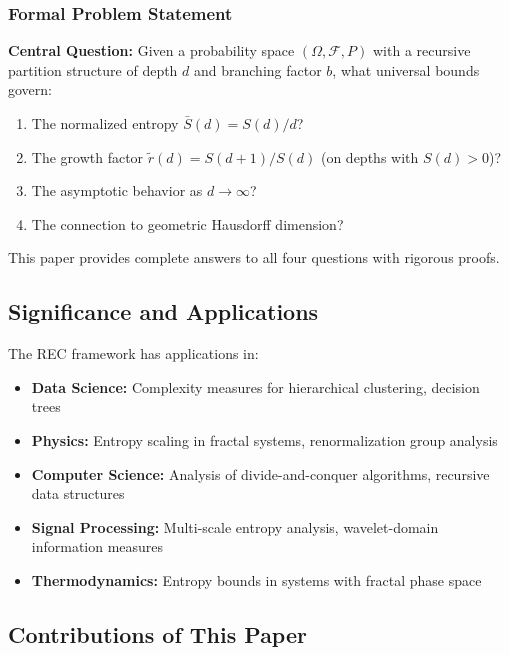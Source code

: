 \documentclass[11pt,a4paper]{article}
\theoremstyle{definition}
\theoremstyle{remark}
\newcommand{\Sbar}{\bar{S}}
\newcommand{\rtilde}{\tilde{r}}
\newcommand{\Field}{\mathcal{F}}
\begin{document}
\subsubsection{Formal Problem Statement}

\begin{mdframed}[backgroundcolor=gray!10]
\textbf{Central Question:} Given a probability space $(\Omega, \Field, P)$ with a recursive partition structure of depth $d$ and branching factor $b$, what universal bounds govern:
\begin{enumerate}[nosep]
    \item[(i)] The normalized entropy $\Sbar(d) = S(d)/d$?
    \item[(ii)] The growth factor $\rtilde(d) = S(d+1)/S(d)$ (on depths with $S(d)>0$)?
    \item[(iii)] The asymptotic behavior as $d \to \infty$?
    \item[(iv)] The connection to geometric Hausdorff dimension?
\end{enumerate}
\end{mdframed}

This paper provides complete answers to all four questions with rigorous proofs.

\subsection{Significance and Applications}

The REC framework has applications in:

\begin{itemize}
    \item \textbf{Data Science:} Complexity measures for hierarchical clustering, decision trees
    \item \textbf{Physics:} Entropy scaling in fractal systems, renormalization group analysis
    \item \textbf{Computer Science:} Analysis of divide-and-conquer algorithms, recursive data structures
    \item \textbf{Signal Processing:} Multi-scale entropy analysis, wavelet-domain information measures
    \item \textbf{Thermodynamics:} Entropy bounds in systems with fractal phase space
\end{itemize}

\subsection{Contributions of This Paper}
\label{subsec:contributions}
\end{document}
